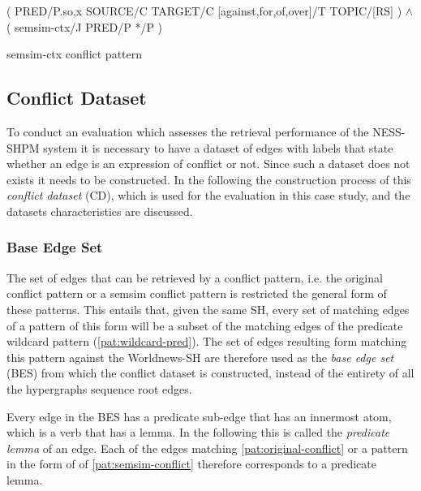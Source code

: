 \documentclass[11pt]{scrreprt}
\begin{document}
\begin{pattern}[H]
  \normalfont\sffamily
  \centering
  ( PRED/P.{so,x} SOURCE/C TARGET/C [against,for,of,over]/T TOPIC/[RS] ) \(\wedge\)\\ 
  ( semsim-ctx/J PRED/P */P )
  \caption{semsim-ctx conflict pattern}
  \label{pat:semsim-ctx-conflict}
\end{pattern}



\subsection{Conflict Dataset}
\label{sec:conflict-dataset}
To conduct an evaluation which assesses the retrieval performance of the NESS-SHPM system it is necessary to have a dataset of edges with labels that state whether an edge is an expression of conflict or not. Since such a dataset does not exists it needs to be constructed. In the following the construction process of this \textit{conflict dataset} (CD), which is used for the evaluation in this case study, and the datasets characteristics are discussed.


\subsubsection{Base Edge Set}
The set of edges that can be retrieved by a conflict pattern, i.e. the original conflict pattern or a semsim conflict pattern is restricted the general form of these patterns. This entails that, given the same SH, every set of matching edges of a pattern of this form will be a subset of the matching edges of the predicate wildcard pattern (\cref{pat:wildcard-pred}). The set of edges resulting form matching this pattern against the Worldnews-SH are therefore used as the \textit{base edge set} (BES) from which the conflict dataset is constructed, instead of the entirety of all the hypergraphs sequence root edges.

Every edge in the BES has a predicate sub-edge that has an innermost atom, which is a verb that has a lemma. In the following this is called the \textit{predicate lemma} of an edge. Each of the edges matching \cref{pat:original-conflict} or a pattern in the form of of \cref{pat:semsim-conflict} therefore corresponds to a predicate lemma.

\end{document}
